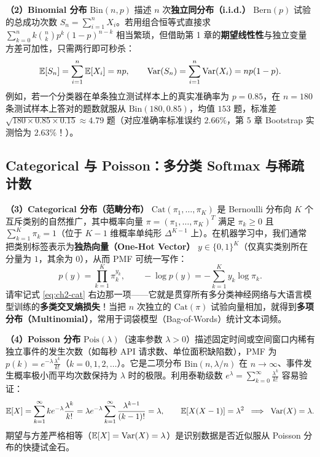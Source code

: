 \textbf{（2）Binomial 分布} $\mathrm{Bin}(n, p)$ 描述 $n$ 次\textbf{独立同分布（i.i.d.）} $\mathrm{Bern}(p)$ 试验的总成功次数 $S_n = \sum_{i=1}^n X_i$。若用组合恒等式直接求 $\sum_{k=0}^n k\binom{n}{k}p^k(1-p)^{n-k}$ 相当繁琐，但借助第 1 章的\textbf{期望线性性}与独立变量方差可加性，只需两行即可秒杀：
\[
  \mathbb{E}[S_n] = \sum_{i=1}^n \mathbb{E}[X_i] = np, \qquad
  \operatorname{Var}(S_n) = \sum_{i=1}^n \operatorname{Var}(X_i) = np(1 - p).
\]
例如，若一个分类器在单条独立测试样本上的真实准确率为 $p = 0.85$，在 $n = 180$ 条测试样本上答对的题数就服从 $\mathrm{Bin}(180, 0.85)$，均值 $153$ 题，标准差 $\sqrt{180\times 0.85\times 0.15} \approx 4.79$ 题（对应准确率标准误约 $2.66\%$，第 5 章 Bootstrap 实测恰为 $2.63\%$！）。

\subsection{Categorical 与 Poisson：多分类 Softmax 与稀疏计数}

\textbf{（3）Categorical 分布（范畴分布）} $\mathrm{Cat}(\pi_1, \dots, \pi_K)$ 是 Bernoulli 分布向 $K$ 个互斥类别的自然推广，其中概率向量 $\pi = (\pi_1, \dots, \pi_K)^T$ 满足 $\pi_k \ge 0$ 且 $\sum_{k=1}^K \pi_k = 1$（位于 $K-1$ 维概率单纯形 $\Delta^{K-1}$ 上）。在机器学习中，我们通常把类别标签表示为\textbf{独热向量（One-Hot Vector）} $y \in \{0, 1\}^K$（仅真实类别所在分量为 $1$，其余为 $0$），从而 PMF 可统一写作：
\begin{equation}
  p(y) = \prod_{k=1}^K \pi_k^{y_k}, \qquad -\log p(y) = -\sum_{k=1}^K y_k \log \pi_k. \label{eq:ch2-cat}
\end{equation}
请牢记式 \eqref{eq:ch2-cat} 右边那一项——它就是贯穿所有多分类神经网络与大语言模型训练的\textbf{多类交叉熵损失}！当把 $n$ 次独立的 $\mathrm{Cat}(\pi)$ 试验向量相加，就得到\textbf{多项分布（Multinomial）}，常用于词袋模型（Bag-of-Words）统计文本词频。

\textbf{（4）Poisson 分布} $\mathrm{Pois}(\lambda)$（速率参数 $\lambda > 0$）描述固定时间或空间窗口内稀有独立事件的发生次数（如每秒 API 请求数、单位面积缺陷数），PMF 为 $p(k) = e^{-\lambda}\frac{\lambda^k}{k!}$（$k=0, 1, 2, \dots$）。它是二项分布 $\mathrm{Bin}(n, \lambda/n)$ 在 $n \to \infty$、事件发生概率极小而平均次数保持为 $\lambda$ 时的极限。利用泰勒级数 $e^\lambda = \sum_{k=0}^\infty \frac{\lambda^k}{k!}$ 容易验证：
\[
  \mathbb{E}[X] = \sum_{k=1}^\infty k e^{-\lambda}\frac{\lambda^k}{k!} = \lambda e^{-\lambda}\sum_{k=1}^\infty \frac{\lambda^{k-1}}{(k-1)!} = \lambda, \qquad
  \mathbb{E}[X(X-1)] = \lambda^2 \;\implies\; \operatorname{Var}(X) = \lambda.
\]
期望与方差严格相等（$\mathbb{E}[X] = \operatorname{Var}(X) = \lambda$）是识别数据是否近似服从 Poisson 分布的快捷试金石。

